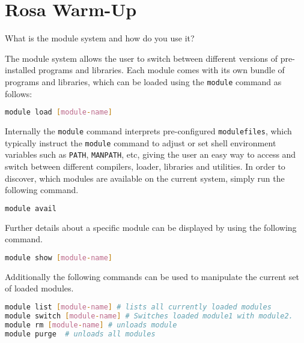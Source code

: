 \section{Rosa Warm-Up }

\begin{question} \label{q:1-1}
What is the module system and how do you use it?
\end{question}
The module system allows the user to switch between different versions of pre-installed programs and libraries.
Each module comes with its own bundle of programs and libraries, which can be loaded using the \texttt{module} command as follows:
\begin{lstlisting}[language=bash]
module load [module-name]
\end{lstlisting}
Internally the \texttt{module} command interprets pre-configured \texttt{modulefiles}, which typically instruct the \texttt{module} command to adjust or set shell environment variables such as \texttt{PATH}, \texttt{MANPATH}, etc, giving the user an easy way to access and switch between different compilers, loader, libraries and utilities.\newline
In order to discover, which modules are available on the current system, simply run the following command. \cite{noauthor_compute_nodate, noauthor_module1_nodate}
\begin{lstlisting}[language=bash]
module avail
\end{lstlisting}
Further details about a specific module can be displayed by using the following command.
\begin{lstlisting}[language=bash]
module show [module-name]
\end{lstlisting}
Additionally the following commands can be used to manipulate the current set of loaded modules.
\begin{lstlisting}[language=bash]
module list [module-name] # lists all currently loaded modules
module switch [module-name] # Switches loaded module1 with module2.
module rm [module-name] # unloads module
module purge  # unloads all modules
\end{lstlisting} 



